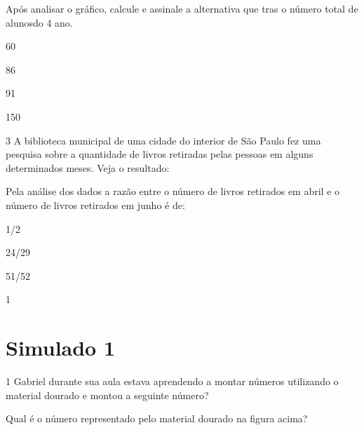{%

Após analisar o gráfico, calcule e assinale a alternativa que tras o
número total de alunosdo 4 ano.

\begin{escolha}
\item
  60
\item
  86
\item
  91
\item
  150
\end{escolha}



\num{3} A biblioteca municipal de uma cidade do interior de São Paulo fez
uma pesquisa sobre a quantidade de livros retiradas pelas pessoas em
alguns determinados meses. Veja o resultado:


Pela análise dos dados a razão entre o número de livros retirados em
abril e o número de livros retirados em junho é de:

\begin{escolha}
\item
  1/2
\item
  24/29
\item
  51/52
\item
  1
\end{escolha}



\chapter{Simulado 1}

\num{1} Gabriel durante sua aula estava aprendendo a montar números
utilizando o material dourado e montou a seguinte número?


Qual é o número representado pelo material dourado na figura acima?

}
